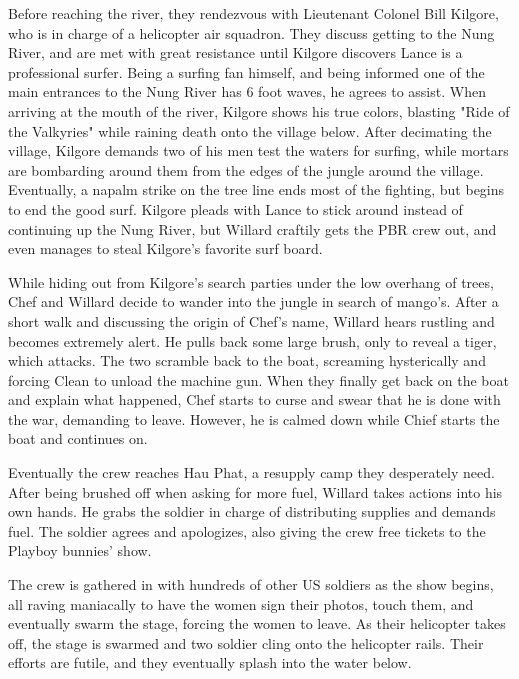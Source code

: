 \documentclass[a4paper,man,natbib]{apa6}
\begin{document}
Before reaching the river, they rendezvous with Lieutenant Colonel Bill Kilgore, who is in charge of a helicopter air squadron. They discuss getting to the Nung River, and are met with great resistance until Kilgore discovers Lance is a professional surfer. Being a surfing fan himself, and being informed one of the main entrances to the Nung River has 6 foot waves, he agrees to assist. When arriving at the mouth of the river, Kilgore shows his true colors, blasting "Ride of the Valkyries" while raining death onto the village below. After decimating the village, Kilgore demands two of his men test the waters for surfing, while mortars are bombarding around them from the edges of the jungle around the village. Eventually, a napalm strike on the tree line ends most of the fighting, but begins to end the good surf. Kilgore pleads with Lance to stick around instead of continuing up the Nung River, but Willard craftily gets the PBR crew out, and even manages to steal Kilgore's favorite surf board.

While hiding out from Kilgore's search parties under the low overhang of trees, Chef and Willard decide to wander into the jungle in search of mango's. After a short walk and discussing the origin of Chef's name, Willard hears rustling and becomes extremely alert. He pulls back some large brush, only to reveal a tiger, which attacks. The two scramble back to the boat, screaming hysterically and forcing Clean to unload the machine gun. When they finally get back on the boat and explain what happened, Chef starts to curse and swear that he is done with the war, demanding to leave. However, he is calmed down while Chief starts the boat and continues on. 

Eventually the crew reaches Hau Phat, a resupply camp they desperately need. After being brushed off when asking for more fuel, Willard takes actions into his own hands. He grabs the soldier in charge of distributing supplies and demands fuel. The soldier agrees and apologizes, also giving the crew free tickets to the Playboy bunnies' show.

The crew is gathered in with hundreds of other US soldiers as the show begins, all raving maniacally to have the women sign their photos, touch them, and eventually swarm the stage, forcing the women to leave. As their helicopter takes off, the stage is swarmed and two soldier cling onto the helicopter rails. Their efforts are futile, and they eventually splash into the water below.
\end{document}
